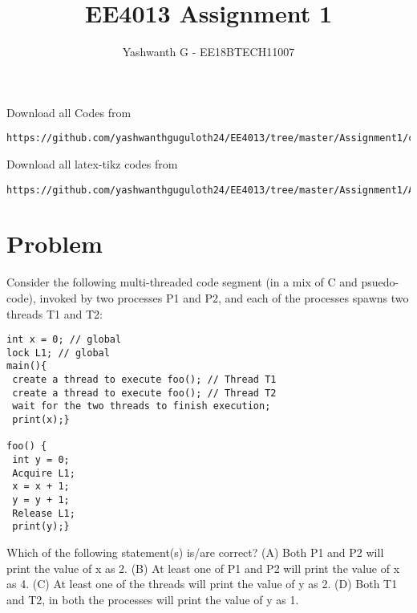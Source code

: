 \documentclass[journal,12pt,twocolumn]{IEEEtran}
\begin{document}
     \def\rightbox#1{\makebox[0in][r]{#1}}
     \def\centbox#1{\makebox[0in]{#1}}					
     \def\topbox#1{\raisebox{-\baselineskip}[0in][0in]{#1}}
     \def\midbox#1{\raisebox{-0.5\baselineskip}[0in][0in]{#1}}
\vspace{3cm}
\title{EE4013 Assignment 1}
\author{Yashwanth G - EE18BTECH11007}
\maketitle
\newpage
\bigskip
\renewcommand{\thefigure}{\theenumi}
\renewcommand{\thetable}{\theenumi}
Download all Codes from 
%
\begin{lstlisting}
https://github.com/yashwanthguguloth24/EE4013/tree/master/Assignment1/codes
\end{lstlisting}
Download all latex-tikz codes from 
\begin{lstlisting}
https://github.com/yashwanthguguloth24/EE4013/tree/master/Assignment1/Assignment1.tex
\end{lstlisting}
\section{Problem}
Consider the following multi-threaded code segment (in a mix of C and psuedo-code), invoked by two processes P1 and P2, and each of the processes spawns two threads T1 and T2:
\begin{lstlisting}
int x = 0; // global
lock L1; // global
main(){
 create a thread to execute foo(); // Thread T1
 create a thread to execute foo(); // Thread T2
 wait for the two threads to finish execution;
 print(x);}

foo() {
 int y = 0;
 Acquire L1;
 x = x + 1;
 y = y + 1;
 Release L1;
 print(y);}
\end{lstlisting}
Which of the following statement(s) is/are correct?
\newline
(A) Both P1 and P2 will print the value of x as 2.
\newline
(B) At least one of P1 and P2 will print the value of x as 4.
\newline
(C) At least one of the threads will print the value of y as 2.
\newline
(D) Both T1 and T2, in both the processes will print the value of y as 1.
\end{document}
